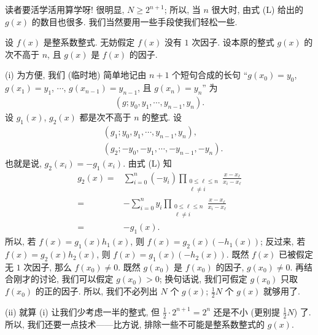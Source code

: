 \begin{remark}
    读者要活学活用算学呀! 很明显, $N \geq 2^{n+1}$; 所以, 当 $n$ 很大时, 由式 (L) 给出的 $g(x)$ 的数目也很多. 我们当然要用一些手段使我们轻松一些.

    设 $f(x)$ 是整系数整式. 无妨假定 $f(x)$ 没有 $1$ 次因子. 设本原的整式 $g(x)$ 的次不高于 $n$, 且 $g(x)$ 是 $f(x)$ 的因子.

    (i) 为方便, 我们 (临时地) 简单地记由 $n+1$ 个短句合成的长句 ``$g(x_0) = y_0$, $g(x_1) = y_1$, $\cdots$, $g(x_{n-1}) = y_{n-1}$, 且 $g(x_n) = y_n$'' 为
    \begin{align*}
        (g; y_0, y_1, \cdots, y_{n-1}, y_n).
    \end{align*}
    设 $g_1 (x)$, $g_2 (x)$ 都是次不高于 $n$ 的整式. 设
    \begin{align*}
         & (g_1; y_0, y_1, \cdots, y_{n-1}, y_n),     \\
         & (g_2; -y_0, -y_1, \cdots, -y_{n-1}, -y_n).
    \end{align*}
    也就是说, $g_2 (x_i) = -g_1 (x_i)$. 由式 (L) 知
    \begin{align*}
        g_2 (x)
        = {} & \sum_{i = 0}^{n} (-y_i) \prod_{\begin{smallmatrix}0 \leq \ell \leq n \\\ell \neq i\end{smallmatrix}} \frac{x - x_\ell}{x_i - x_\ell} \\
        = {} & -\sum_{i = 0}^{n} y_i \prod_{\begin{smallmatrix}0 \leq \ell \leq n \\\ell \neq i\end{smallmatrix}} \frac{x - x_\ell}{x_i - x_\ell}   \\
        = {} & {-g_1 (x)}.
    \end{align*}
    所以, 若 $f(x) = g_1 (x) h_1 (x)$, 则 $f(x) = g_2 (x) (-h_1 (x))$; 反过来, 若 $f(x) = g_2 (x) h_2 (x)$, 则 $f(x) = g_1 (x) (-h_2 (x))$. 既然 $f(x)$ 已被假定无 $1$ 次因子, 那么 $f(x_0) \neq 0$. 既然 $g(x_0)$ 是 $f(x_0)$ 的因子, $g(x_0) \neq 0$. 再结合刚才的讨论, 我们可以假定 $g(x_0) > 0$; 换句话说, 我们可假定 $g(x_0)$ 只取 $f(x_0)$ 的正的因子. 所以, 我们不必列出 $N$ 个 $g(x)$; $\frac{1}{2} N$ 个 $g(x)$ 就够用了.

    (ii) 就算 (i) 让我们少考虑一半的整式, 但 $\frac{1}{2} \cdot 2^{n+1} = 2^n$ 还是不小 (更别提 $\frac{1}{2} N$) 了. 所以, 我们还要一点技术——比方说, 排除一些不可能是整系数整式的 $g(x)$.


\end{remark}
